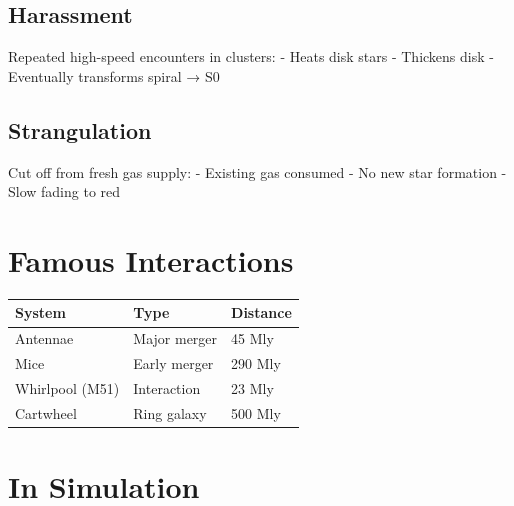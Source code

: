 \documentclass[
  11pt,
  letterpaper,
  twoside,
  openright]{book}
\begin{document}
\subsection{Harassment}\label{harassment}

Repeated high-speed encounters in clusters: - Heats disk stars -
Thickens disk - Eventually transforms spiral → S0

\subsection{Strangulation}\label{strangulation}

Cut off from fresh gas supply: - Existing gas consumed - No new star
formation - Slow fading to red

\section{Famous Interactions}\label{famous-interactions}

\begin{longtable}[]{@{}lll@{}}
\toprule\noalign{}
System & Type & Distance \\
\midrule\noalign{}
\endhead
\bottomrule\noalign{}
\endlastfoot
Antennae & Major merger & 45 Mly \\
Mice & Early merger & 290 Mly \\
Whirlpool (M51) & Interaction & 23 Mly \\
Cartwheel & Ring galaxy & 500 Mly \\
\end{longtable}

\section{In Simulation}\label{in-simulation-17}
\end{document}
